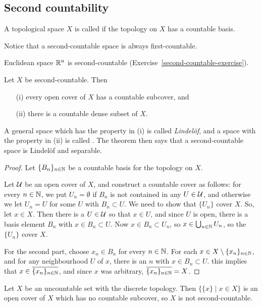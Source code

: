 \subsection{Second countability}
\begin{defn}
  A topological space $X$ is called  if the topology on $X$ has a countable basis.
\end{defn}
Notice that a second-countable space is always first-countable.
\begin{example}
  Euclidean space $\mathbb{R}^n$ is second-countable (Exercise~\ref{second-countable-exercise}).
\end{example}
\begin{thm}
  Let $X$ be second-countable. Then
  \begin{itemize}
    \item[(i)] every open cover of $X$ has a countable subcover, and
    \item[(ii)] there is a countable dense subset of $X$.
  \end{itemize}
\end{thm}
A general space which has the property in (i) is called \emph{Lindel{\"o}f}, and a space with the property in (ii) is called . The theorem then says that a second-countable space is Lindel{\"o}f and separable.
\begin{proof}
  Let $\{B_n\}_{n \in \mathbb{N}}$ be a countable basis for the topology on $X$.
  
  Let $\mathcal{U}$ be an open cover of $X$, and construct a countable cover as follows: for every $n \in \mathbb{N}$, we put $U_n = \emptyset$ if $B_n$ is not contained in any $U \in \mathcal{U}$, and otherwise we let $U_n = U$ for some $U$ with $B_n \subset U$. We need to show that $\{U_n\}$ cover $X$. So, let $x \in X$. Then there is a $U \in \mathcal{U}$ so that $x \in U$, and since $U$ is open, there is a basis element $B_n$ with $x \in B_n \subset U$. Now $x \in B_n \subset U_n$, so $x \in \bigcup_{n\in \mathbb{N}} U_n$, so the $\{U_n\}$ cover $X$.
  
  For the second part, choose $x_n \in B_n$ for every $n \in \mathbb{N}$. For each $x \in X \setminus \{x_n\}_{n \in \mathbb{N}}$, and for any neighbourhood $U$ of $x$, there is an $n$ with $x \in B_n \subset U$. this implies that $x \in \overline{\{x_n\}_{n \in \mathbb{N}}}$, and since $x$ was arbitrary, $\overline{\{x_n\}_{n \in \mathbb{N}}} = X$.
\end{proof}
\begin{example}
  \label{non-second-countable}
  Let $X$ be an uncountable set with the discrete topology. Then $\{ \{x\} \mid x \in X\}$ is an open cover of $X$ which has no countable subcover, so $X$ is not second-countable.
\end{example}
